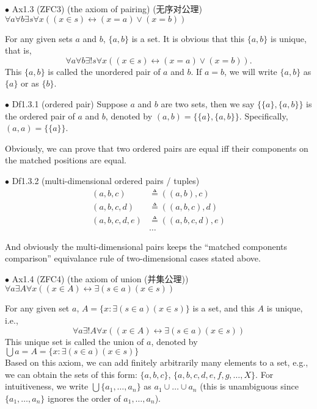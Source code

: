 \documentclass{article}
\begin{document}
\begin{Ax}{$\bullet$ Ax1.3 (ZFC3) (the axiom of pairing) (无序对公理)}
    \textcolor{Ax}{$\forall a\forall b\exists s\forall x \left((x\in s)\leftrightarrow (x=a)\lor (x=b)\right)$}
\end{Ax}
For any given sets $a$ and $b$, $\{a,b\}$ is a set. It is obvious that \textcolor{Th}{this $\{a,b\}$ is unique, that is, $$\forall a\forall b\exists! s\forall x \left((x\in s)\leftrightarrow (x=a)\lor (x=b)\right).$$} \textcolor{Df}{This $\{a,b\}$ is called the unordered pair of $a$ and $b$. If $a=b$, we will write $\{a,b\}$ as $\{a\}$ or as $\{b\}$.}

\begin{Df}{$\bullet$ Df1.3.1 (ordered pair)}
    Suppose $a$ and $b$ are two sets, then we say $\{\{a\}, \{a,b\}\}$ is the ordered pair of $a$ and $b$, denoted by $(a,b) = \{\{a\}, \{a,b\}\}$. Specifically, $(a,a) = \{\{a\}\}$. 
\end{Df}
\textcolor{Th}{Obviously, we can prove that two ordered pairs are equal iff their components on the matched positions are equal.}

\begin{Df}{$\bullet$ Df1.3.2 (multi-dimensional ordered pairs / tuples)}
    \begin{align*}
        (a,b,c)&\triangleq ((a,b),c)\\
        (a,b,c,d)&\triangleq ((a,b,c),d)\\
        (a,b,c,d,e)&\triangleq ((a,b,c,d),e)\\
        &\dots
    \end{align*}
\end{Df}
And obviously \textcolor{Th}{the multi-dimensional pairs keeps the ``matched components comparison'' equivalance rule of two-dimensional cases stated above.}

\begin{Ax}{$\bullet$ Ax1.4 (ZFC4) (the axiom of union (并集公理))}
    \textcolor{Ax}{$\forall a \exists A \forall x \left((x\in A)\leftrightarrow \exists (s\in a)(x\in s)\right)$}
\end{Ax}
For any given set $a$, $A = \{x: \exists (s\in a) (x\in s)\}$ is a set, \textcolor{Th}{and this $A$ is unique, i.e., 
$$\forall a \exists! A \forall x \left((x\in A)\leftrightarrow \exists (s\in a)(x\in s)\right)$$}
\textcolor{Df}{This unique set is called the union of $a$, denoted by $\bigcup a = A = \{x: \exists (s\in a) (x\in s)\}$}\\
Based on this axiom, we can add finitely arbitrarily many elements to a set, e.g., we can obtain the sets of this form: $\{a,b,c\}$, $\{a,b,c,d,e,f,g,\dots,X\}$. For intuitiveness, we write $\bigcup \{a_1, \dots, a_n\} $ as $a_1\cup \dots \cup a_n$ (this is unambiguous since $\{a_1, \dots, a_n\}$ ignores the order of $a_1,\dots, a_n$).
\end{document}
